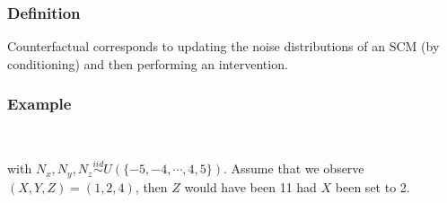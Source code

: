 \documentclass{beamer}
\begin{document}
\begin{frame}
    \frametitle{Definition} 
    \begin{flushleft}
        Counterfactual corresponds to updating the noise distributions of an SCM (by conditioning) and then 
        performing an intervention.
    \end{flushleft}
\end{frame}

\begin{frame}
    \frametitle{Example}
     \\
    \begin{flushleft}
        with $N_x,N_y,N_z\overset{iid}\sim U(\{-5,-4,\cdots,4,5\})$. Assume that we observe $(X,Y,Z)=(1,2,4)$, then $Z$ would have
        been 11 had $X$ been set to 2.
    \end{flushleft}
\end{frame}
\end{document}
